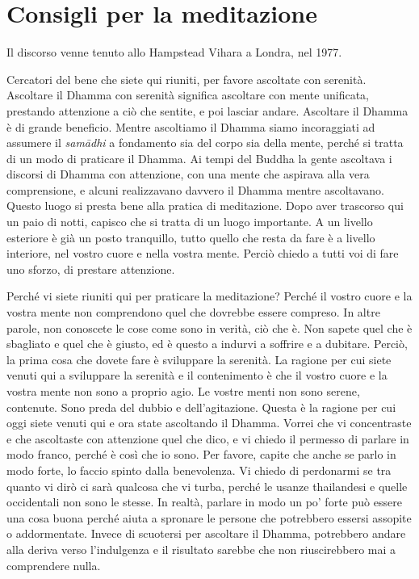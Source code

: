 \chapter{Consigli per la meditazione}

\begin{openingQuote}
  Il discorso venne tenuto allo Hampstead Vihara a Londra, nel 1977.
\end{openingQuote}

Cercatori del bene che siete qui riuniti, per favore ascoltate con
serenità. Ascoltare il Dhamma con serenità significa ascoltare con mente
unificata, prestando attenzione a ciò che sentite, e poi lasciar andare.
Ascoltare il Dhamma è di grande beneficio. Mentre ascoltiamo il Dhamma
siamo incoraggiati ad assumere il \emph{samādhi} a fondamento sia del
corpo sia della mente, perché si tratta di un modo di praticare il
Dhamma. Ai tempi del Buddha la gente ascoltava i discorsi di Dhamma con
attenzione, con una mente che aspirava alla vera comprensione, e alcuni
realizzavano davvero il Dhamma mentre ascoltavano. Questo luogo si
presta bene alla pratica di meditazione. Dopo aver trascorso qui un paio
di notti, capisco che si tratta di un luogo importante. A un livello
esteriore è già un posto tranquillo, tutto quello che resta da fare è a
livello interiore, nel vostro cuore e nella vostra mente. Perciò chiedo
a tutti voi di fare uno sforzo, di prestare attenzione.

Perché vi siete riuniti qui per praticare la meditazione? Perché il
vostro cuore e la vostra mente non comprendono quel che dovrebbe essere
compreso. In altre parole, non conoscete le cose come sono in verità,
ciò che è. Non sapete quel che è sbagliato e quel che è giusto, ed è
questo a indurvi a soffrire e a dubitare. Perciò, la prima cosa che
dovete fare è sviluppare la serenità. La ragione per cui siete venuti
qui a sviluppare la serenità e il contenimento è che il vostro cuore e
la vostra mente non sono a proprio agio. Le vostre menti non sono
serene, contenute. Sono preda del dubbio e dell'agitazione. Questa è la
ragione per cui oggi siete venuti qui e ora state ascoltando il Dhamma.
Vorrei che vi concentraste e che ascoltaste con attenzione quel che
dico, e vi chiedo il permesso di parlare in modo franco, perché è così
che io sono. Per favore, capite che anche se parlo in modo forte, lo
faccio spinto dalla benevolenza. Vi chiedo di perdonarmi se tra quanto
vi dirò ci sarà qualcosa che vi turba, perché le usanze thailandesi e
quelle occidentali non sono le stesse. In realtà, parlare in modo un po'
forte può essere una cosa buona perché aiuta a spronare le persone che
potrebbero essersi assopite o addormentate. Invece di scuotersi per
ascoltare il Dhamma, potrebbero andare alla deriva verso l'indulgenza e
il risultato sarebbe che non riuscirebbero mai a comprendere nulla.

